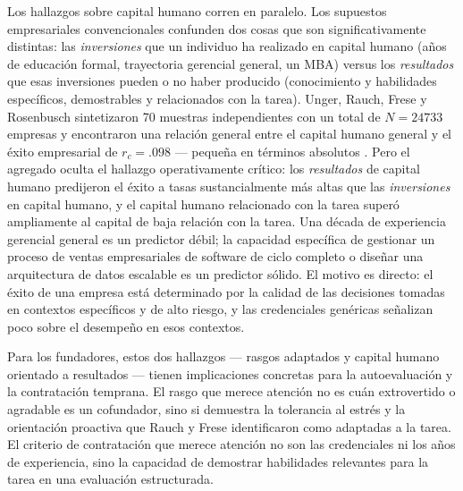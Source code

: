 Los hallazgos sobre capital humano corren en paralelo. Los supuestos empresariales
convencionales confunden dos cosas que son significativamente distintas: las \emph{inversiones}
que un individuo ha realizado en capital humano (años de educación formal, trayectoria gerencial
general, un MBA) versus los \emph{resultados} que esas inversiones pueden o no haber producido
(conocimiento y habilidades específicos, demostrables y relacionados con la tarea). Unger, Rauch,
Frese y Rosenbusch sintetizaron \num{70} muestras independientes con un total de
$N = \num{24733}$ empresas y encontraron una relación general entre el capital humano general y
el éxito empresarial de $r_c = .098$ --- pequeña en términos absolutos
\parencite{unger2011human}. %
Pero el agregado oculta el hallazgo operativamente crítico: los \emph{resultados} de capital
humano predijeron el éxito a tasas sustancialmente más altas que las \emph{inversiones} en
capital humano, y el capital humano relacionado con la tarea superó ampliamente al capital de
baja relación con la tarea. Una década de experiencia gerencial general es un predictor débil;
la capacidad específica de gestionar un proceso de ventas empresariales de software de ciclo
completo o diseñar una arquitectura de datos escalable es un predictor sólido. El motivo es
directo: el éxito de una empresa está determinado por la calidad de las decisiones tomadas en
contextos específicos y de alto riesgo, y las credenciales genéricas señalizan poco sobre el
desempeño en esos contextos.

Para los fundadores, estos dos hallazgos --- rasgos adaptados y capital humano orientado a
resultados --- tienen implicaciones concretas para la autoevaluación y la contratación temprana.
El rasgo que merece atención no es cuán extrovertido o agradable es un cofundador, sino si
demuestra la tolerancia al estrés y la orientación proactiva que Rauch y Frese identificaron
como adaptadas a la tarea. El criterio de contratación que merece atención no son las
credenciales ni los años de experiencia, sino la capacidad de demostrar habilidades relevantes
para la tarea en una evaluación estructurada.

